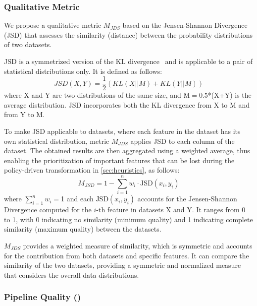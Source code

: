 \subsubsection{Qualitative Metric}
We propose a qualitative metric $M_{JDS}$ based on the Jensen-Shannon Divergence (JSD) that assesses the similarity (distance) between the probability distributions of two datasets.

JSD is a symmetrized version of the KL divergence~\cite{Fuglede} and is applicable to a pair of statistical distributions only. It is defined as follows:
\[JSD(X, Y) = \frac{1}{2} \left( KL(X || M)
  + KL(Y || M) \right)\]
%
where X and Y are two distributions of the same size, and M$=$0.5*(X+Y) is the average distribution.
JSD incorporates both the KL divergence from X to M and from Y to M.

To make JSD applicable to datasets, where each feature in the dataset has its own statistical distribution, metric $M_{JDS}$ applies JSD to each column of the dataset. The obtained results are then aggregated using a weighted average, thus enabling the prioritization of important features that can be lost during the policy-driven transformation in \cref{sec:heuristics}, as follows: \[M_{JSD} = 1 - \sum_{i=1}^n w_i \cdot \text{JSD}(x_i,y_i)\]
where $\sum_{i=1}^n w_i$$=$1 and each \(\text{JSD}(x_i,y_i)\) accounts for the Jensen-Shannon Divergence computed for the \(i\)-th feature in datasets X and Y. It ranges from 0 to 1, with 0 indicating no similarity (minimum quality) and 1 indicating complete similarity (maximum quality) between the datasets.

$M_{JDS}$ provides a weighted measure of similarity, which is symmetric and accounts for the contribution from both datasets and specific features. It can compare the similarity of the two datasets, providing a symmetric and normalized measure that considers the overall data distributions.


\subsubsection{Pipeline Quality (\q)}

